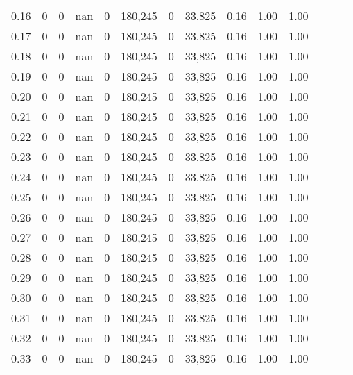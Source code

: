 \begin{tabular}{rrrrrrrrrrrrrr}
0.16 &       0 &      0 &   nan &        0 &  180,245 &       0 &  33,825 &  0.16 &  1.00 &      1.00 \\
0.17 &       0 &      0 &   nan &        0 &  180,245 &       0 &  33,825 &  0.16 &  1.00 &      1.00 \\
0.18 &       0 &      0 &   nan &        0 &  180,245 &       0 &  33,825 &  0.16 &  1.00 &      1.00 \\
0.19 &       0 &      0 &   nan &        0 &  180,245 &       0 &  33,825 &  0.16 &  1.00 &      1.00 \\
0.20 &       0 &      0 &   nan &        0 &  180,245 &       0 &  33,825 &  0.16 &  1.00 &      1.00 \\
0.21 &       0 &      0 &   nan &        0 &  180,245 &       0 &  33,825 &  0.16 &  1.00 &      1.00 \\
0.22 &       0 &      0 &   nan &        0 &  180,245 &       0 &  33,825 &  0.16 &  1.00 &      1.00 \\
0.23 &       0 &      0 &   nan &        0 &  180,245 &       0 &  33,825 &  0.16 &  1.00 &      1.00 \\
0.24 &       0 &      0 &   nan &        0 &  180,245 &       0 &  33,825 &  0.16 &  1.00 &      1.00 \\
0.25 &       0 &      0 &   nan &        0 &  180,245 &       0 &  33,825 &  0.16 &  1.00 &      1.00 \\
0.26 &       0 &      0 &   nan &        0 &  180,245 &       0 &  33,825 &  0.16 &  1.00 &      1.00 \\
0.27 &       0 &      0 &   nan &        0 &  180,245 &       0 &  33,825 &  0.16 &  1.00 &      1.00 \\
0.28 &       0 &      0 &   nan &        0 &  180,245 &       0 &  33,825 &  0.16 &  1.00 &      1.00 \\
0.29 &       0 &      0 &   nan &        0 &  180,245 &       0 &  33,825 &  0.16 &  1.00 &      1.00 \\
0.30 &       0 &      0 &   nan &        0 &  180,245 &       0 &  33,825 &  0.16 &  1.00 &      1.00 \\
0.31 &       0 &      0 &   nan &        0 &  180,245 &       0 &  33,825 &  0.16 &  1.00 &      1.00 \\
0.32 &       0 &      0 &   nan &        0 &  180,245 &       0 &  33,825 &  0.16 &  1.00 &      1.00 \\
0.33 &       0 &      0 &   nan &        0 &  180,245 &       0 &  33,825 &  0.16 &  1.00 &      1.00 \\

\end{tabular}
